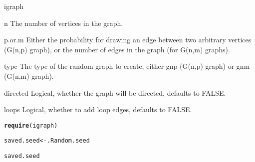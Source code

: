\documentclass{article}\usepackage[]{graphicx}\usepackage[]{color}
\makeatletter
\newcommand{\hlstd}[1]{\textcolor[rgb]{0.345,0.345,0.345}{#1}}%
\newcommand{\hlkwb}[1]{\textcolor[rgb]{0.69,0.353,0.396}{#1}}%
\newcommand{\hlkwd}[1]{\textcolor[rgb]{0.737,0.353,0.396}{\textbf{#1}}}%
\newenvironment{kframe}{%
 \def\at@end@of@kframe{}%
 \ifinner\ifhmode%
  \def\at@end@of@kframe{\end{minipage}}%
  \begin{minipage}{\columnwidth}%
 \fi\fi%
 \def\FrameCommand##1{\hskip\@totalleftmargin \hskip-\fboxsep
 \colorbox{shadecolor}{##1}\hskip-\fboxsep
     \hskip-\linewidth \hskip-\@totalleftmargin \hskip\columnwidth}%
 \MakeFramed {\advance\hsize-\width
   \@totalleftmargin\z@ \linewidth\hsize
   \@setminipage}}%
 {\par\unskip\endMakeFramed%
 \at@end@of@kframe}
\newenvironment{knitrout}{}{} %
\makeatother
\begin{document}
igraph

n
The number of vertices in the graph.

p.or.m
Either the probability for drawing an edge between two arbitrary vertices (G(n,p) graph), or the number of edges in the graph (for G(n,m) graphs).

type
The type of the random graph to create, either gnp (G(n,p) graph) or gnm (G(n,m) graph).

directed
Logical, whether the graph will be directed, defaults to FALSE.

loops
Logical, whether to add loop edges, defaults to FALSE.

\begin{knitrout}
\color{fgcolor}\begin{kframe}
\begin{alltt}
\hlkwd{require}\hlstd{(igraph)}
\end{alltt}


{\ttfamily\noindent\itshape\color{messagecolor}{\#\# Loading required package: igraph}}\begin{alltt}
\hlstd{saved.seed} \hlkwb{<-} \hlstd{.Random.seed}
\end{alltt}


{\ttfamily\noindent\bfseries\color{errorcolor}{\#\# Error: object '.Random.seed' not found}}\begin{alltt}
\hlstd{saved.seed}
\end{alltt}



\end{kframe}
\end{knitrout}
\end{document}
